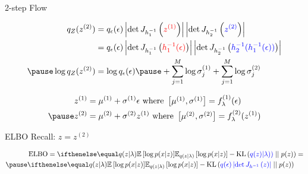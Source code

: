 \documentclass[14pt]{beamer}
\begin{document}
\begin{frame}{2-step Flow}
\begin{small}
\begin{equation*}
\begin{aligned}
q_{Z}(z^{(2)}) &= q_{\epsilon}(\epsilon)\djac{h^{-1}_{1}}{\textcolor{red}{z^{(1)}}}\djac{h^{-1}_{2}}{\textcolor{blue}{z^{(2)}}} \\
&= q_{\epsilon}(\epsilon)\djac{h^{-1}_{1}}{\textcolor{red}{h^{-1}_{1}(\epsilon)}}\djac{h^{-1}_{2}}{\textcolor{blue}{h^{-1}_{2}(h^{-1}_{1}(\epsilon))}} \\ \pause
\log q_{Z}(z^{(2)}) &= \log q_{\epsilon}(\epsilon) \pause + \sum_{j=1}^{M}\log\sigma^{(1)}_{j} + \sum_{j=1}^{M}\log\sigma^{(2)}_{j}
\end{aligned}
\end{equation*}
\end{small}
\pause
\begin{equation*}
\begin{aligned}
z^{(1)} &= \mu^{(1)} + \sigma^{(1)}\epsilon \text{ where } \begin{bmatrix}\mu^{(1)}, \sigma^{(1)}\end{bmatrix} = f^{(1)}_{\lambda}(\epsilon) \\ \pause
z^{(2)} &= \mu^{(2)} + \sigma^{(2)}z^{(1)} \text{ where } \begin{bmatrix}\mu^{(2)}, \sigma^{(2)}\end{bmatrix} = f^{(2)}_{\lambda}(z^{(1)})
\end{aligned}
\end{equation*}
\end{frame}

\begin{frame}{ELBO}
Recall: $ z = z^{(2)} $
\begin{small}
\begin{equation*}
\begin{aligned}
&\ELBO = \E[q(z|\lambda)]{\log p(x|z)} - \KL{\textcolor{blue}{q(z)|\lambda))}}{p(z)} = \\ \pause
&\E[q(z|\lambda)]{\log p(x|z)} - \KL{\textcolor{blue}{q(\epsilon)\djac{h^{-1}}{z}}}{p(z)}
\end{aligned}
\end{equation*}
\end{small}
\end{frame}
\end{document}
